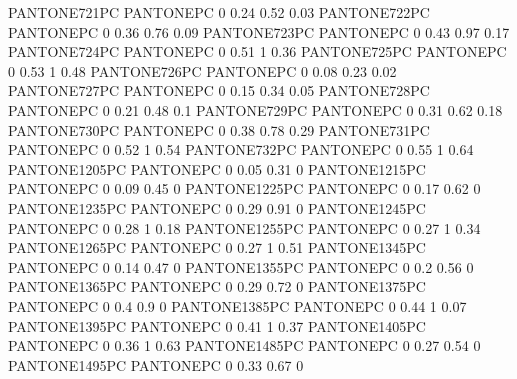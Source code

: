  {PANTONE721PC} {PANTONE\SpotSpace PC} {0 0.24 0.52 0.03}
 {PANTONE722PC} {PANTONE\SpotSpace PC} {0 0.36 0.76 0.09}
 {PANTONE723PC} {PANTONE\SpotSpace PC} {0 0.43 0.97 0.17}
 {PANTONE724PC} {PANTONE\SpotSpace PC} {0 0.51 1 0.36}
 {PANTONE725PC} {PANTONE\SpotSpace PC} {0 0.53 1 0.48}
 {PANTONE726PC} {PANTONE\SpotSpace PC} {0 0.08 0.23 0.02}
 {PANTONE727PC} {PANTONE\SpotSpace PC} {0 0.15 0.34 0.05}
 {PANTONE728PC} {PANTONE\SpotSpace PC} {0 0.21 0.48 0.1}
 {PANTONE729PC} {PANTONE\SpotSpace PC} {0 0.31 0.62 0.18}
 {PANTONE730PC} {PANTONE\SpotSpace PC} {0 0.38 0.78 0.29}
 {PANTONE731PC} {PANTONE\SpotSpace PC} {0 0.52 1 0.54}
 {PANTONE732PC} {PANTONE\SpotSpace PC} {0 0.55 1 0.64}
 {PANTONE1205PC} {PANTONE\SpotSpace PC} {0 0.05 0.31 0}
 {PANTONE1215PC} {PANTONE\SpotSpace PC} {0 0.09 0.45 0}
 {PANTONE1225PC} {PANTONE\SpotSpace PC} {0 0.17 0.62 0}
 {PANTONE1235PC} {PANTONE\SpotSpace PC} {0 0.29 0.91 0}
 {PANTONE1245PC} {PANTONE\SpotSpace PC} {0 0.28 1 0.18}
 {PANTONE1255PC} {PANTONE\SpotSpace PC} {0 0.27 1 0.34}
 {PANTONE1265PC} {PANTONE\SpotSpace PC} {0 0.27 1 0.51}
 {PANTONE1345PC} {PANTONE\SpotSpace PC} {0 0.14 0.47 0}
 {PANTONE1355PC} {PANTONE\SpotSpace PC} {0 0.2 0.56 0}
 {PANTONE1365PC} {PANTONE\SpotSpace PC} {0 0.29 0.72 0}
 {PANTONE1375PC} {PANTONE\SpotSpace PC} {0 0.4 0.9 0}
 {PANTONE1385PC} {PANTONE\SpotSpace PC} {0 0.44 1 0.07}
 {PANTONE1395PC} {PANTONE\SpotSpace PC} {0 0.41 1 0.37}
 {PANTONE1405PC} {PANTONE\SpotSpace PC} {0 0.36 1 0.63}
 {PANTONE1485PC} {PANTONE\SpotSpace PC} {0 0.27 0.54 0}
 {PANTONE1495PC} {PANTONE\SpotSpace PC} {0 0.33 0.67 0}
